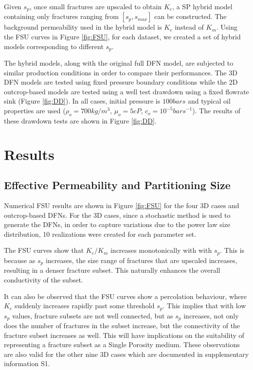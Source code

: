\documentclass[a4paper]{article}
\begin{document}
Given $s_p$, once small fractures are upscaled to obtain $K_e$, a SP hybrid model containing only fractures ranging from $[s_p,s_{max}]$ can be constructed. The background permeability used in the hybrid model is $K_e$ instead of $K_m$. Using the FSU curves in Figure \ref{fig:FSU}, for each dataset, we created a set of hybrid models corresponding to different $s_p$. 

The hybrid models, along with the original full DFN model, are subjected to similar production conditions in order to compare their performances. The 3D DFN models are tested using fixed pressure boundary conditions while the 2D outcrop-based models are tested using a well test drawdown using a fixed flowrate sink (Figure \ref{fig:DD}). In all cases, initial pressure is $100 bars$ and typical oil properties are used ($\rho_o=700 kg/m^3$, $\mu_o=5 cP$, $c_o=10^{-5} {bars}^{-1}$). The results of these drawdown tests are shown in Figure \ref{fig:DD}.

\section{Results}
\subsection{Effective Permeability and Partitioning Size}
Numerical FSU results are shown in Figure \ref{fig:FSU} for the four 3D cases and outcrop-based DFNs. For the 3D cases, since a stochastic method is used to generate the DFNs, in order to capture variations due to the power law size distribution, 10 realizations were created for each parameter set. 

The FSU curves show that $K_e/K_m$ increases monotonically with with $s_p$. This is because as $s_p$ increases, the size range of fractures that are upscaled increases, resulting in a denser fracture subset. This naturally enhances the overall conductivity of the subset.

It can also be observed that the FSU curves show a percolation behaviour, where $K_e$ suddenly increases rapidly past some threshold $s_p$. This implies that with low $s_p$ values, fracture subsets are not well connected, but as $s_p$ increases, not only does the number of fractures in the subset increase, but the connectivity of the fracture subset increases as well. This will have implications on the suitability of representing a fracture subset as a Single Porosity medium. These observations are also valid for the other nine 3D cases which are documented in supplementary information S1.
\end{document}
